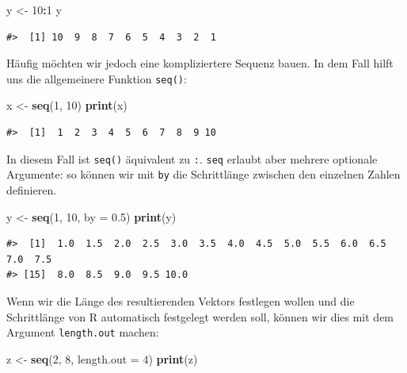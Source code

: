 \documentclass[]{book}
\newenvironment{Shaded}{\begin{snugshade}}{\end{snugshade}}
\newcommand{\KeywordTok}[1]{\textcolor[rgb]{0.13,0.29,0.53}{\textbf{#1}}}
\newcommand{\DataTypeTok}[1]{\textcolor[rgb]{0.13,0.29,0.53}{#1}}
\newcommand{\DecValTok}[1]{\textcolor[rgb]{0.00,0.00,0.81}{#1}}
\newcommand{\FloatTok}[1]{\textcolor[rgb]{0.00,0.00,0.81}{#1}}
\newcommand{\StringTok}[1]{\textcolor[rgb]{0.31,0.60,0.02}{#1}}
\newcommand{\OperatorTok}[1]{\textcolor[rgb]{0.81,0.36,0.00}{\textbf{#1}}}
\newcommand{\NormalTok}[1]{#1}
\begin{document}
\begin{Shaded}
\begin{Highlighting}[]
\NormalTok{y <-}\StringTok{ }\DecValTok{10}\OperatorTok{:}\DecValTok{1}
\NormalTok{y}
\end{Highlighting}
\end{Shaded}

\begin{verbatim}
#>  [1] 10  9  8  7  6  5  4  3  2  1
\end{verbatim}

Häufig möchten wir jedoch eine kompliziertere Sequenz bauen. In dem Fall
hilft uns die allgemeinere Funktion \texttt{seq()}:

\begin{Shaded}
\begin{Highlighting}[]
\NormalTok{x <-}\StringTok{ }\KeywordTok{seq}\NormalTok{(}\DecValTok{1}\NormalTok{, }\DecValTok{10}\NormalTok{)}
\KeywordTok{print}\NormalTok{(x)}
\end{Highlighting}
\end{Shaded}

\begin{verbatim}
#>  [1]  1  2  3  4  5  6  7  8  9 10
\end{verbatim}

In diesem Fall ist \texttt{seq()} äquivalent zu \texttt{:}. \texttt{seq}
erlaubt aber mehrere optionale Argumente: so können wir mit \texttt{by}
die Schrittlänge zwischen den einzelnen Zahlen definieren.

\begin{Shaded}
\begin{Highlighting}[]
\NormalTok{y <-}\StringTok{ }\KeywordTok{seq}\NormalTok{(}\DecValTok{1}\NormalTok{, }\DecValTok{10}\NormalTok{, }\DataTypeTok{by =} \FloatTok{0.5}\NormalTok{)}
\KeywordTok{print}\NormalTok{(y)}
\end{Highlighting}
\end{Shaded}

\begin{verbatim}
#>  [1]  1.0  1.5  2.0  2.5  3.0  3.5  4.0  4.5  5.0  5.5  6.0  6.5  7.0  7.5
#> [15]  8.0  8.5  9.0  9.5 10.0
\end{verbatim}

Wenn wir die Länge des resultierenden Vektors festlegen wollen und die
Schrittlänge von R automatisch festgelegt werden soll, können wir dies
mit dem Argument \texttt{length.out} machen:

\begin{Shaded}
\begin{Highlighting}[]
\NormalTok{z <-}\StringTok{ }\KeywordTok{seq}\NormalTok{(}\DecValTok{2}\NormalTok{, }\DecValTok{8}\NormalTok{, }\DataTypeTok{length.out =} \DecValTok{4}\NormalTok{)}
\KeywordTok{print}\NormalTok{(z)}
\end{Highlighting}
\end{Shaded}
\end{document}
